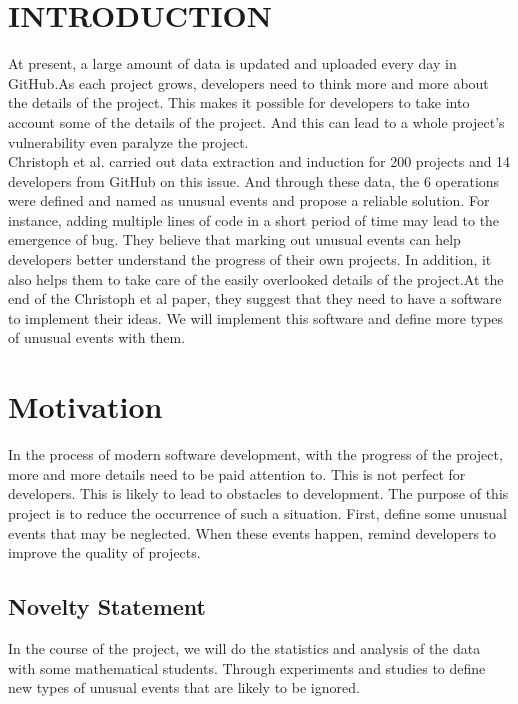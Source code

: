 \documentclass[conference]{IEEEtran}
\begin{document}
\section{INTRODUCTION}

At present, a large amount of data is updated and uploaded every day in GitHub.As each project grows, developers need to think more and more about the details of the project. This makes it possible for developers to take into account some of the details of the project. And this can lead to a whole project's vulnerability even paralyze the project.\\

Christoph et al. carried out data extraction and induction for 200 projects and 14 developers from GitHub on this issue. And through these data, the 6 operations were defined and named as unusual events and propose a reliable solution. For instance, adding multiple lines of code in a short period of time may lead to the emergence of bug. They believe that marking out unusual events can help developers better understand the progress of their own projects. In addition, it also helps them to take care of the easily overlooked details of the project.At the end of the Christoph et al paper, they suggest that they need to have a software to implement their ideas. We will implement this software and define more types of unusual events with them.

\section{Motivation}

In the process of modern software development, with the progress of the project, more and more details need to be paid attention to. This is not perfect for developers. This is likely to lead to obstacles to development. The purpose of this project is to reduce the occurrence of such a situation. First, define some unusual events that may be neglected. When these events happen, remind developers to improve the quality of projects. 

\subsection{Novelty Statement}

In the course of the project, we will do the statistics and analysis of the data with some mathematical students. Through experiments and studies to define new types of unusual events that are likely to be ignored.
\end{document}
